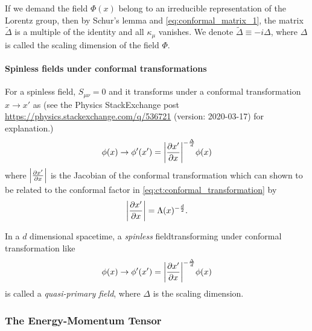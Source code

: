 \documentclass[10pt]{article}
\begin{document}
\begin{remark}
    If we demand the field $\Phi(x)$ belong to an irreducible representation of the Lorentz group, then by Schur's lemma and \cref{eq:conformal_matrix_1}, the matrix $\tilde{\Delta}$ is a multiple of the identity and all $\kappa_\mu$ vanishes.
    We denote $\tilde{\Delta}\equiv-i\Delta$, where $\Delta$ is called the scaling dimension of the field $\Phi$.
\end{remark}
\paragraph{Spinless fields under conformal transformations}
For a spinless field, $S_{\mu\nu}=0$ and it transforms under a conformal transformation $x\to x'$ as (see the Physics StackExchange post \url{https://physics.stackexchange.com/q/536721} (version: 2020-03-17) for explanation.)
\begin{align}
    \phi(x)\to\phi'(x')=\abs{\pdv{x'}{x}}^{-\frac{\Delta}{d}}\phi(x)\label{eq:representation:spinless_trans}
\end{align}
where $\abs{\pdv{x'}{x}}$ is the Jacobian of the conformal transformation which can shown to be related to the conformal factor in \cref{eq:ct:conformal_transformation} by
\begin{align}
    \abs{\pdv{x'}{x}}=\Lambda(x)^{-\frac{d}{2}}.\label{eq:quasi_field_def}
\end{align}
\begin{definition}\label{def:quasi_primary_field}
    In a $d$ dimensional spacetime, a \textit{spinless} field\snm transforming under conformal transformation like
    \begin{align}
        \phi(x)\to\phi'(x')=\abs{\pdv{x'}{x}}^{-\frac{\Delta}{d}}\phi(x)
    \end{align}
    is called a \textit{quasi-primary field}, where $\Delta$ is the scaling dimension.
\end{definition}

\subsubsection{The Energy-Momentum Tensor\label{subsubsec:conformal_em_tensor}}
\end{document}
